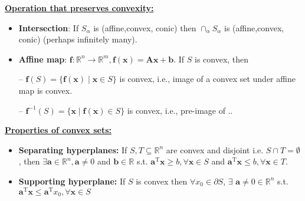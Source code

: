 \underline{\textbf{Operation that preserves convexity:}}

\begin{itemize}

\item \textbf{Intersection}: If $S_{\alpha}$ is (affine,convex, conic) then $\cap_{\alpha} S_{\alpha}$ is (affine,convex, conic) (perhaps infinitely many).

\item \textbf{Affine map}: $\bm{f}: \mathbb{R}^{n} \rightarrow \mathbb{R}^{m}, \bm{f}(\bm{x})=\mathbf{A}\bm{x+b}$. If $S$ is convex, then

    -- $\bm{f}(S)=\{\bm{f}(\bm{x}) \mid \bm{x} \in S\}$ is convex, i.e., image of a convex set under affine map is convex.
    
    --  $\bm{f}^{-1}(S)=\{\bm{x} \mid \bm{f}(\bm{x}) \in S\}$ is convex, i.e., pre-image of ..

\end{itemize}

\underline{\textbf{Properties of convex sets:}}

\begin{itemize}

\item \textbf{Separating hyperplanes:} 
If $S, T \subseteq \mathbb{R}^{n}$ are convex and disjoint i.e. $S \cap T=\emptyset$, then $\exists \bm{a} \in \mathbb{R}^{n},  \bm{a} \neq 0$ and $\bm{b} \in \mathbb{R}$ s.t. $\bm{a}^{\mathrm{T}} \bm{x} \geq {b}, \forall \bm{x} \in S$ and $\bm{a}^{\mathrm{T}} \bm{x} \leq {b}, \forall \bm{x} \in T$.

\item \textbf{Supporting hyperplane:} If $S$ is convex then $\forall x_{0} \in \partial S$, $\exists$ $\bm{a} \neq 0 \in \mathbb{R}^{n}$ s.t. $\bm{a}^{\mathrm{T}} \bm{x} \leq \bm{a}^{\mathrm{T}} x_{0} , \forall \bm{x} \in S$


\end{itemize}


